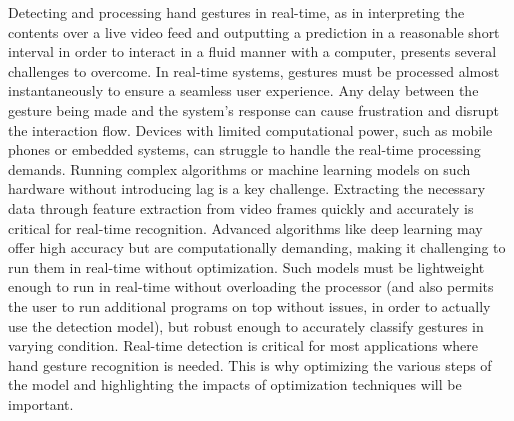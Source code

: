 \documentclass[12pt]{article}
\begin{document}
Detecting and processing hand gestures in real-time, as in interpreting the contents over a live video feed and outputting a prediction in a reasonable short interval in order to interact in a fluid manner with a computer, presents several challenges to overcome.
In real-time systems, gestures must be processed almost instantaneously to ensure a seamless user experience. Any delay between the gesture being made and the system’s response can cause frustration and disrupt the interaction flow. Devices with limited computational power, such as mobile phones or embedded systems, can struggle to handle the real-time processing demands. Running complex algorithms or machine learning models on such hardware without introducing lag is a key challenge.
Extracting the necessary data through feature extraction from video frames quickly and accurately is critical for real-time recognition. Advanced algorithms like deep learning may offer high accuracy but are computationally demanding, making it challenging to run them in real-time without optimization. Such models must be lightweight enough to run in real-time without overloading the processor (and also permits the user to run additional programs on top without issues, in order to actually use the detection model), but robust enough to accurately classify gestures in varying condition.
Real-time detection is critical for most applications where hand gesture recognition is needed. This is why optimizing the various steps of the model and highlighting the impacts of optimization techniques will be important.
\end{document}
